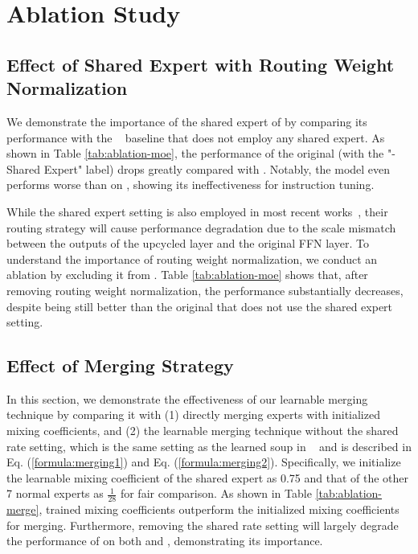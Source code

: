 \section{Ablation Study}

\subsection{Effect of Shared Expert with Routing Weight Normalization}


We demonstrate the importance of the shared expert of \ours by comparing its performance with
the \sparseupcycle~\cite{komatsuzaki2023sparse} baseline that does not employ any shared expert. As shown in Table \ref{tab:ablation-moe}, the performance of the original \sparseupcycle (with the "- Shared Expert" label) drops greatly compared with \oursmoe. Notably, the \sparseupcycle model even performs worse than \baselineds on \humanevalp, showing its ineffectiveness for instruction tuning.

While the shared expert setting is also employed in most recent works~\cite{dai2024deepseekmoe, gou2024mixture}, their routing strategy will cause performance degradation due to the scale mismatch between the outputs of the upcycled \moe layer and the original FFN layer. To understand the importance of routing weight normalization, we conduct an ablation by excluding it from \ours.
Table \ref{tab:ablation-moe} shows that, after removing routing weight normalization, the performance substantially decreases, despite being still better than the original \sparseupcycle that does not use the shared expert setting.

\subsection{Effect of Merging Strategy}\label{sec:ablation_merging}


In this section, we demonstrate the effectiveness of our learnable merging technique by comparing it with (1) directly merging experts with initialized mixing coefficients, and (2) the learnable merging technique without the shared rate setting, which is the same setting as the learned soup in \modelsoup~\cite{wortsman2022model} and is described in Eq. (\ref{formula:merging1}) and Eq. (\ref{formula:merging2}). 
Specifically, we initialize the learnable mixing coefficient of the shared expert as 0.75 and that of the other 7 normal experts as $\frac{1}{28}$ for fair comparison. As shown in Table \ref{tab:ablation-merge}, trained mixing coefficients outperform the initialized mixing coefficients for merging. Furthermore, removing the shared rate setting will largely degrade the performance of \oursmerge on both \humaneval and \humanevalp, demonstrating its importance.

